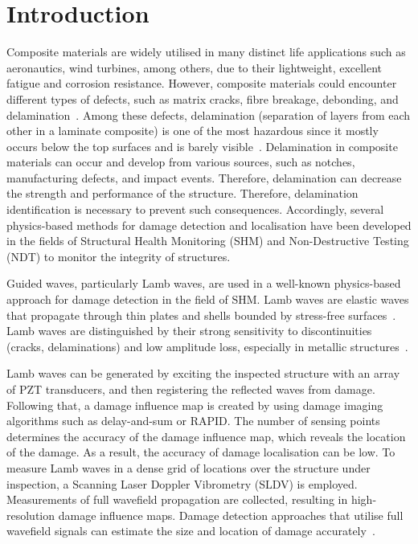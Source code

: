 \documentclass{IOS-Book-Article}
\begin{document}
\section{Introduction}
\begin{sloppypar}
	Composite materials are widely utilised in many distinct life applications such as aeronautics, wind turbines, among others, due to their lightweight, excellent fatigue and corrosion resistance.
	However, composite materials could encounter different types of defects, such as matrix cracks, fibre breakage, debonding, and delamination~\cite{smith2009composite, ip2004delamination}. 
	Among these defects, delamination (separation of layers from each other in a laminate composite) is one of the most hazardous since it mostly occurs below the top surfaces and is barely visible~\cite{Cai2012a}.
	Delamination in composite materials can occur and develop from various sources, such as notches,  manufacturing defects, and impact events. Therefore, delamination can decrease the strength and performance of the structure. 
	Therefore, delamination identification is necessary to prevent such consequences. 
	Accordingly, several physics-based methods for damage detection and localisation have been developed in the fields of Structural Health Monitoring (SHM) and Non-Destructive Testing (NDT) to monitor the integrity of structures.
	
	Guided waves, particularly Lamb waves, are used in a well-known physics-based approach for damage detection in the field of SHM.
	Lamb waves are elastic waves that propagate through thin plates and shells bounded by stress-free surfaces~\cite{mitra2016guided}.
	Lamb waves are distinguished by their strong sensitivity to discontinuities (cracks, delaminations) and low amplitude loss, especially in metallic structures~\cite{Keulen2014}.
	
	Lamb waves can be generated by exciting the inspected structure with an array of PZT transducers, and then registering the reflected waves from damage.
	Following that, a damage influence map is created by using damage imaging algorithms such as delay-and-sum or RAPID.
	The number of sensing points determines the accuracy of the damage influence map, which reveals the location of the damage.
	As a result, the accuracy of damage localisation can be low.
	To measure Lamb waves in a dense grid of locations over the structure under inspection, a Scanning Laser Doppler Vibrometry (SLDV) is employed.
	Measurements of full wavefield propagation are collected, resulting in high-resolution damage influence maps.
	Damage detection approaches that utilise full wavefield signals can estimate the size and location of damage accurately~\cite{Girolamo2018a, kudela2018impact}.
	

\end{sloppypar}
\end{document}
